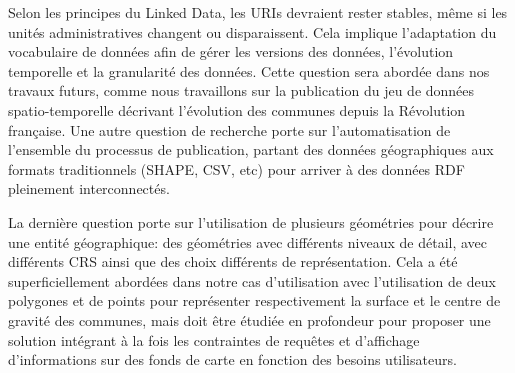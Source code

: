 Selon les principes du Linked Data, les URIs devraient rester stables, m\^{e}me si les unit\'{e}s administratives changent ou disparaissent. Cela implique l'adaptation du vocabulaire de donn\'{e}es afin de g\'{e}rer les versions des donn\'{e}es, l'\'{e}volution temporelle et la granularit\'{e} des donn\'{e}es. Cette question sera abord\'{e}e dans nos travaux futurs, comme nous travaillons sur la publication du jeu de donn\'{e}es spatio-temporelle d\'{e}crivant l'\'{e}volution des communes depuis la R\'{e}volution fran\c{c}aise. Une autre question de recherche porte sur l'automatisation de l'ensemble du processus de publication, partant des donn\'{e}es g\'{e}ographiques aux formats traditionnels (SHAPE, CSV, etc) pour arriver \`{a} des donn\'{e}es RDF pleinement interconnect\'{e}s.

La derni\`{e}re question porte sur l'utilisation de plusieurs g\'{e}om\'{e}tries pour d\'{e}crire une entit\'{e} g\'{e}ographique: des g\'{e}om\'{e}tries avec diff\'{e}rents niveaux de d\'{e}tail, avec diff\'{e}rents CRS ainsi que des choix diff\'{e}rents de repr\'{e}sentation. Cela a \'{e}t\'{e} superficiellement abord\'{e}es dans notre cas d'utilisation avec l'utilisation de deux polygones et de points pour repr\'{e}senter respectivement la surface et le centre de gravit\'{e} des communes, mais doit \^{e}tre \'{e}tudi\'{e}e en profondeur pour proposer une solution int\'{e}grant \`{a} la fois les contraintes de requ\^{e}tes et d'affichage d'informations sur des fonds de carte en fonction des besoins utilisateurs.


